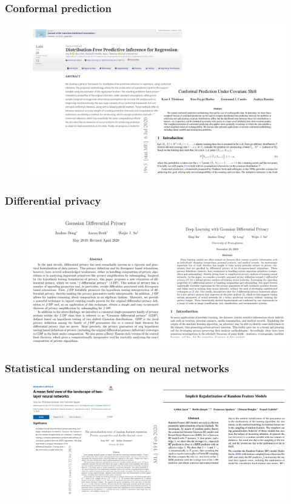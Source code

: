 \documentclass[10pt]{beamer}
\begin{document}
  
     


\begin{frame}
\frametitle{Conformal prediction}
\begin{figure}[h!]
\centering
\includegraphics[scale=0.2]{f5.png} 
\end{figure}  
\end{frame}
  

\begin{frame}
\frametitle{Differential privacy}
\begin{figure}[h!]
\centering
\includegraphics[scale=0.3]{f6.png} 
\end{figure}  
\end{frame}



\begin{frame}
\frametitle{Statistical understanding on neural networks}
\begin{figure}[h!]
\centering
\includegraphics[scale=0.2]{f7.png} 
\end{figure}  
\end{frame}
\end{document}
